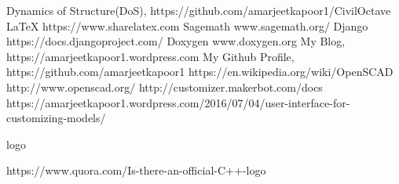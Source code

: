 \begin{thebibliography}{9}
\bibitem{} Dynamics of Structure(DoS), https://github.com/amarjeetkapoor1/CivilOctave
\bibitem{} \LaTeX{} https://www.sharelatex.com
\bibitem{} Sagemath www.sagemath.org/
\bibitem{} Django https://docs.djangoproject.com/
\bibitem{} Doxygen www.doxygen.org
\bibitem{} My Blog, https://amarjeetkapoor1.wordpress.com
\bibitem{} My Github Profile, https://github.com/amarjeetkapoor1
https://en.wikipedia.org/wiki/OpenSCAD
http://www.openscad.org/
http://customizer.makerbot.com/docs
https://amarjeetkapoor1.wordpress.com/2016/07/04/user-interface-for-customizing-models/


logo

https://www.quora.com/Is-there-an-official-C++-logo










\end{thebibliography}
